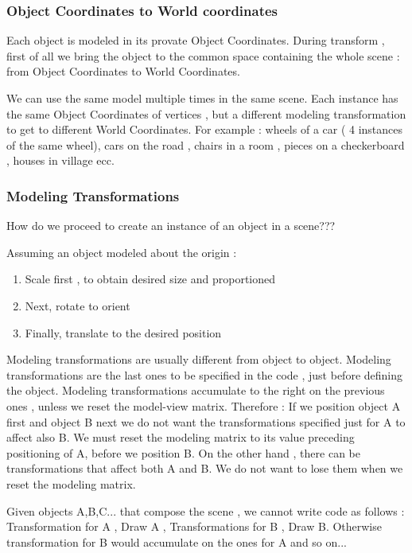 \documentclass{article}
\begin{document}
\subsubsection{Object Coordinates to World coordinates}
Each object is modeled in its provate Object Coordinates.
During transform , first of all we bring the object to the common space containing the whole scene : from Object Coordinates to World Coordinates.

We can use the same model multiple times in the same scene. 
Each instance has the same Object Coordinates of vertices , but a different modeling transformation to get to different World Coordinates.
For example : wheels of a car ( 4 instances of the same wheel), cars on the road , chairs in a room , pieces on a checkerboard , houses in village ecc.

\subsubsection{Modeling Transformations }

How do we proceed to create an instance of an object in a scene???

Assuming an object modeled about the origin :

\begin{enumerate}
    \item Scale first , to obtain desired size and proportioned
    \item Next, rotate to orient
    \item Finally, translate to the desired position
\end{enumerate}

Modeling transformations are usually different from object to object.
Modeling transformations are the last ones to be specified in the code , just before defining the object.
Modeling transformations accumulate to the right on the previous ones , unless we reset the model-view matrix.
Therefore : 
If we position object A first and object B next we do not want the transformations specified just for A to affect also B.
We must reset the modeling matrix to its value preceding positioning of A, before we position B.
On the other hand , there can be transformations that affect both A and B. We do not want to lose them when we reset the modeling matrix.

Given objects A,B,C... that compose the scene , we cannot write code as follows : Transformation for A , Draw A , Transformations for B , Draw B.
Otherwise transformation for B would accumulate on the ones for A and so on...
\end{document}
